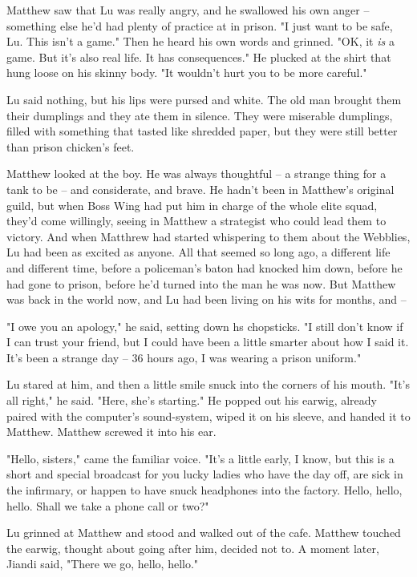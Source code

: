 Matthew saw that Lu was really angry, and he swallowed his own
anger -- something else he'd had plenty of practice at in prison.
"I just want to be safe, Lu. This isn't a game." Then he heard his
own words and grinned. "OK, it \emph{is} a game. But it's also real
life. It has consequences." He plucked at the shirt that hung loose
on his skinny body. "It wouldn't hurt you to be more careful."

Lu said nothing, but his lips were pursed and white. The old man
brought them their dumplings and they ate them in silence. They
were miserable dumplings, filled with something that tasted like
shredded paper, but they were still better than prison chicken's
feet.

Matthew looked at the boy. He was always thoughtful -- a strange
thing for a tank to be -- and considerate, and brave. He hadn't
been in Matthew's original guild, but when Boss Wing had put him in
charge of the whole elite squad, they'd come willingly, seeing in
Matthew a strategist who could lead them to victory. And when
Matthrew had started whispering to them about the Webblies, Lu had
been as excited as anyone. All that seemed so long ago, a different
life and different time, before a policeman's baton had knocked him
down, before he had gone to prison, before he'd turned into the man
he was now. But Matthew was back in the world now, and Lu had been
living on his wits for months, and --

"I owe you an apology," he said, setting down hs chopsticks. "I
still don't know if I can trust your friend, but I could have been
a little smarter about how I said it. It's been a strange day -- 36
hours ago, I was wearing a prison uniform."

Lu stared at him, and then a little smile snuck into the corners of
his mouth. "It's all right," he said. "Here, she's starting." He
popped out his earwig, already paired with the computer's
sound-system, wiped it on his sleeve, and handed it to Matthew.
Matthew screwed it into his ear.

"Hello, sisters," came the familiar voice. "It's a little early, I
know, but this is a short and special broadcast for you lucky
ladies who have the day off, are sick in the infirmary, or happen
to have snuck headphones into the factory. Hello, hello, hello.
Shall we take a phone call or two?"

Lu grinned at Matthew and stood and walked out of the cafe. Matthew
touched the earwig, thought about going after him, decided not to.
A moment later, Jiandi said, "There we go, hello, hello."

